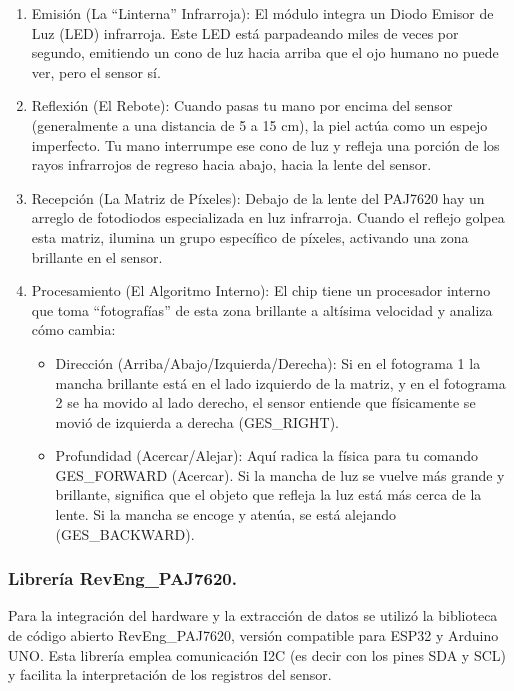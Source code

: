 \documentclass[conference]{IEEEtran}
\begin{document}
\begin{enumerate}
  \item Emisión (La ``Linterna'' Infrarroja): El módulo integra un Diodo Emisor de Luz (LED) infrarroja. Este LED está parpadeando miles de veces por segundo, emitiendo un cono de luz hacia arriba que el ojo humano no puede ver, pero el sensor sí.
  \item Reflexión (El Rebote): Cuando pasas tu mano por encima del sensor (generalmente a una distancia de 5 a 15 cm), la piel actúa como un espejo imperfecto. Tu mano interrumpe ese cono de luz y refleja una porción de los rayos infrarrojos de regreso hacia abajo, hacia la lente del sensor.
  \item Recepción (La Matriz de Píxeles): Debajo de la lente del PAJ7620 hay un arreglo de fotodiodos especializada en luz infrarroja. Cuando el reflejo golpea esta matriz, ilumina un grupo específico de píxeles, activando una zona brillante en el sensor.
  \item Procesamiento (El Algoritmo Interno): El chip tiene un procesador interno que toma ``fotografías'' de esta zona brillante a altísima velocidad y analiza cómo cambia:
    \begin{itemize}
      \item Dirección (Arriba/Abajo/Izquierda/Derecha): Si en el fotograma 1 la mancha brillante está en el lado izquierdo de la matriz, y en el fotograma 2 se ha movido al lado derecho, el sensor entiende que físicamente se movió de izquierda a derecha (GES\_RIGHT).
      \item Profundidad (Acercar/Alejar): Aquí radica la física para tu comando GES\_FORWARD (Acercar). Si la mancha de luz se vuelve más grande y brillante, significa que el objeto que refleja la luz está más cerca de la lente. Si la mancha se encoge y atenúa, se está alejando (GES\_BACKWARD).
    \end{itemize}

\end{enumerate}

\subsubsection{Librería RevEng\_PAJ7620.}

Para la integración del hardware y la extracción de datos se utilizó la biblioteca de código abierto RevEng\_PAJ7620, versión compatible para ESP32 y Arduino UNO. Esta librería emplea comunicación I2C (es decir con los pines SDA y SCL) y facilita la interpretación de los registros del sensor.
\end{document}
